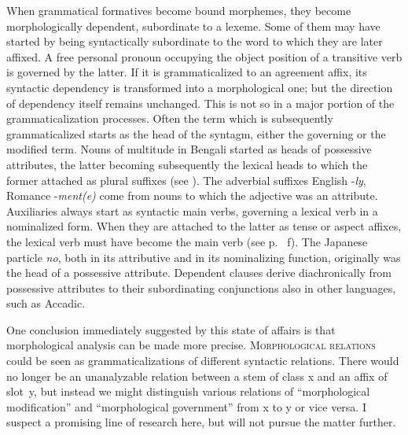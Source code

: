 When grammatical formatives become bound morphemes, they become morphologically dependent, subordinate to a lexeme. Some of them may have started by being syntactically subordinate to the word to which they are later affixed. A free personal pronoun occupying the object position of a transitive verb is governed by the latter. If it is grammaticalized to an agreement affix, its syntactic dependency is transformed into a morphological one; but the direction of dependency itself remains unchanged. This is not so in a major portion of the grammaticalization processes. Often the term which is subsequently grammaticalized starts as the head of the syntagm, either the governing or the modified term. Nouns of multitude in Bengali started as heads of possessive attributes, the latter becoming subsequently the lexical heads to which the former attached as plural suffixes (see \citealt[§2.1]{Kölver1982a}). The adverbial suffixes English -\textit{ly}, Romance -\textit{ment(e)} come from nouns to which the adjective was an attribute. Auxiliaries always start as syntactic main verbs, governing a lexical verb in a nominalized form. When they are attached to the latter as tense or aspect affixes, the lexical verb must have become the main verb (see p.~\pageref{page36}%
f). The Japanese particle \textit{no}, both in its attributive and in its nominalizing function, originally was the head of a possessive attribute. Dependent clauses derive diachronically from possessive attributes to their subordinating conjunctions also in other languages, such as Accadic.

\enlargethispage{1\baselineskip}
One conclusion immediately suggested by this state of affairs is that morphological analysis can be made more precise. \textsc{Morphological relations} could be seen as grammaticalizations of different syntactic relations. There would no longer be an unanalyzable relation between a stem of class x and an affix of \mbox{slot y}, but instead we might distinguish various relations of ``morphological modification'' and ``morphological government'' from x to y or vice versa. I suspect a promising line of research here, but will not pursue the matter further.

